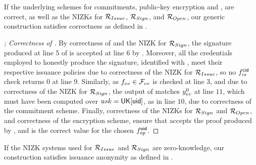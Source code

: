 \begin{theorem}
  \label{thm:correctness-uas}
  If the underlying schemes for commitments, public-key encryption and \SBCM,
  are correct,
  as well as the NIZKs for $\mathcal{R}_{Issue}$, $\mathcal{R}_{Sign}$, and
  $\mathcal{R}_{Open}$, our generic construction \CUASGen satisfies correctness as
  defined in .
\end{theorem}

\begin{proof}[; Correctness of \CUASGen]
  By correctness of \SBCM and the NIZK for $\mathcal{R}_{Sign}$, the signature
  produced at line 5 of \ExpCorrect is accepted at line 6 by \Verify.
  Moreover, all the credentials employed to honestly produce the signature,
  identified with \scid, meet their respective issuance policies due to
  correctness of the NIZK for $\mathcal{R}_{Issue}$, so no $f_{is}^\mathsf{cid}$ check
  returns $0$ at line 9. Similarly, as $f_{ev} \in \mathcal{F}_{ev}$ is checked at
  line 3, and due to correctness of the NIZK for $\mathcal{R}_{Sign}$, the
  output of \feval matches $y_{ev}^0$ at line $11$, which must have been
  computed over $usk=\mathsf{UK}[\mathsf{uid}]$, as in line $10$, due to correctness of the
  commitment scheme. Finally, correctness of the NIZKs for $\mathcal{R}_{Sign}$
  and $\mathcal{R}_{Open}$, and correctness of the encryption scheme, ensure that
  \Judge accepts the proof produced by \Open, and \yinsp is the correct value
  for the chosen $f_{op}^{\mathsf{oid}}$.
\end{proof}

\begin{theorem}
  \label{thm:iss-anonymity-uas}
  If the NIZK systems used for $\mathcal{R}_{Issue}$ and $\mathcal{R}_{Sign}$ are
  zero-knowledge, our \CUASGen construction satisfies issuance anonymity as
  defined in .
\end{theorem}

